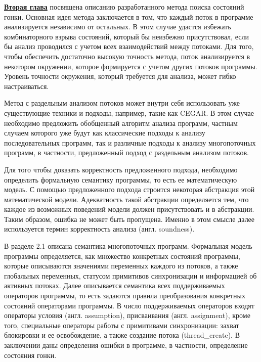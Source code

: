 \underline{\textbf{Вторая глава}} посвящена описанию разработанного метода поиска состояний гонки.
Основная идея метода заключается в том, что каждый поток в программе анализируется независимо от остальных.
В этом случае удастся избежать комбинаторного взрыва состояний, который бы неизбежно присутствовал, если бы анализ проводился с учетом всех взаимодействий между потоками.
Для того, чтобы обеспечить достаточно высокую точность метода, поток анализируется в некотором окружении, которое формируется с учетом других потоков программы. 
Уровень точности окружения, который требуется для анализа, может гибко настраиваться.

Метод с раздельным анализом потоков может внутри себя использовать уже существующие техники и подходы, например, такие как CEGAR.
В этом случае необходимо предложить обобщенный алгоритм анализа программ, частным случаем которого уже будут как классические подходы к анализу последовательных программ, так и различные подходы к анализу многопоточных программ, в частности, предложенный подход с раздельным анализом потоков. 

Для того чтобы доказать корректность предложенного подхода, необходимо определить формальную семантику программы, то есть ее математическую модель.
С помощью предложенного подхода строится некоторая абстракция этой математической модели. 
Адекватность такой абстракции определяется тем, что каждое из возможных поведений модели должен присутствовать и в абстракции.
Таким образом, ошибка не может быть пропущена.
Именно в этом смысле далее используется термин корректность анализа (англ. soundness).

В разделе 2.1 описана семантика многопоточных программ. 
Формальная модель программы определяется, как множество конкретных состояний программы, которые описываются значениями переменных каждого из потоков, а также глобальных переменных, статусом примитивов синхронизации и информацией об активных потоках.
Далее описывается семантика всех поддерживаемых операторов программы, то есть задаются правила преобразования конкретных состояний операторами программы.
В число поддерживаемых операторов входят операторы условия (англ. assumption), присваивания (англ. assignment),
кроме того, специальные операторы работы с примитивами синхронизации: захват блокировки и ее освобождение, а также создание потока (thread\_create).
В заключении даны определения ошибки в программе, в частности, определение состояния гонки.

